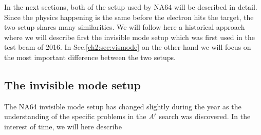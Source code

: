 In the next sections, both of the setup used by NA64 will be described in detail. Since the physics happening is the same before the electron hits the target, the two setup shares many similarities. We will follow here a historical approach where we will describe first the invisible mode setup which was first used in the test beam of 2016. In Sec.\ref{ch2:sec:vismode} on the other hand we will focus on the most important difference between the two setups.


\subsection{The invisible mode setup}
\label{ch2:sec:invismode}

The NA64 invisible mode setup has changed slightly during the year as the understanding of the specific problems in the $A'$ search was discovered. In the interest of time, we will here describe 

